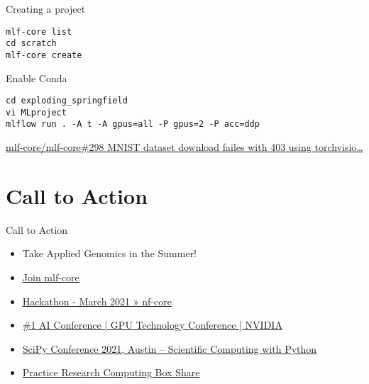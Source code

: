 \documentclass[bigger]{beamer}
\begin{document}
\begin{frame}[label={sec:orge6d3d21},fragile]{Creating a project}
 \begin{verbatim}
mlf-core list
cd scratch
mlf-core create
\end{verbatim}
\end{frame}

\begin{frame}[label={sec:org7e21983},fragile]{Enable Conda}
 \begin{verbatim}
cd exploding_springfield
vi MLproject
mlflow run . -A t -A gpus=all -P gpus=2 -P acc=ddp
\end{verbatim}

\href{https://github.com/mlf-core/mlf-core/issues/298}{mlf-core/mlf-core\#298 MNIST dataset download failes with 403 using torchvisio\ldots{}}
\end{frame}

\section{Call to Action}
\label{sec:orgfa7ea9c}

\begin{frame}[label={sec:org8ecd08c}]{Call to Action}
\begin{itemize}
\item Take Applied Genomics in the Summer!
\item \href{https://www.mlf-core.com/join}{Join mlf-core}
\item \href{https://nf-co.re/events/2021/hackathon-march-2021}{Hackathon - March 2021 » nf-core}
\item \href{https://www.nvidia.com/en-us/gtc/}{\#1 AI Conference | GPU Technology Conference | NVIDIA}
\item \href{https://www.scipy2021.scipy.org/}{SciPy Conference 2021, Austin -- Scientific Computing with Python}
\item \href{http://utd.link/prc}{Practice Research Computing Box Share}
\end{itemize}
\end{frame}
\end{document}
